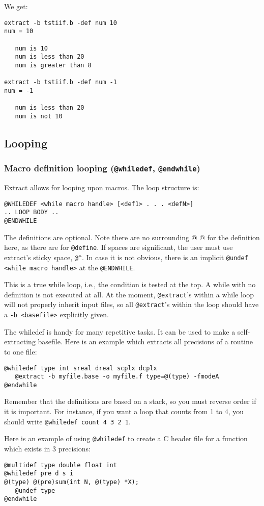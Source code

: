 We get:
\begin{verbatim}
extract -b tstiif.b -def num 10
num = 10

   num is 10
   num is less than 20
   num is greater than 8

extract -b tstiif.b -def num -1
num = -1

   num is less than 20
   num is not 10
\end{verbatim}

\subsection{Looping}

\subsubsection{Macro definition looping ({\tt @whiledef}, {\tt @endwhile})}
\label{sec-whiledef}
Extract allows for looping upon macros.  The loop structure is:
\begin{verbatim}
@WHILEDEF <while macro handle> [<def1> . . . <defN>]
.. LOOP BODY ..
@ENDWHILE
\end{verbatim}
The definitions are optional.  Note there are no surrounding @ @ for the
definition here, as there are for {\tt @define}.  If 
spaces are significant, the user must use extract's sticky space, \verb+@^+.
In case it is not obvious, there is an implicit
{\tt @undef <while macro handle>} at the {\tt @ENDWHILE}.

This is a true while loop, i.e., the condition is tested at the top.  A
while with no definition is not executed at all.  At the moment,
{\tt @extract}'s within a while loop will not properly inherit input
files, so all {\tt @extract}'s within the loop should have a 
{\tt -b <basefile>} explicitly given.

The whiledef is handy for many repetitive tasks.  It can be used to make
a self-extracting basefile.
Here is an example which extracts all precisions of a routine to one file:
\begin{verbatim}
@whiledef type int sreal dreal scplx dcplx
   @extract -b myfile.base -o myfile.f type=@(type) -fmodeA
@endwhile
\end{verbatim}

Remember that the definitions are based on a stack, so you
must reverse order if it is important.  For instance, if you want
a loop that counts from 1 to 4, you should write 
{\tt @whiledef count 4 3 2 1}.

\noindent
Here is an example of using {\tt @whiledef} to create a C header file for
a function which exists in 3 precisions:
\begin{verbatim}
@multidef type double float int
@whiledef pre d s i
@(type) @(pre)sum(int N, @(type) *X);
   @undef type
@endwhile
\end{verbatim}

